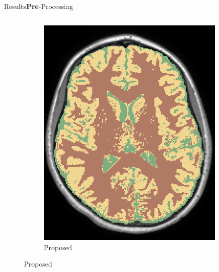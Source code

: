 \documentclass[]{standalone}
\begin{document}
\begin{frame}{Results}{\textbf{Pre}-Processing}
\begin{columns}
\begin{column}{0.65\textwidth}
\begin{figure}[h!]
\begin{subfigure}{0.3\textwidth}
					\includegraphics[scale=0.11]{./IMG/SEG48.png}
					\caption*{\tiny Proposed}
				\end{subfigure}
			\end{figure}
		\end{column}
	\end{columns}
	
	\end{frame}
\end{document}

